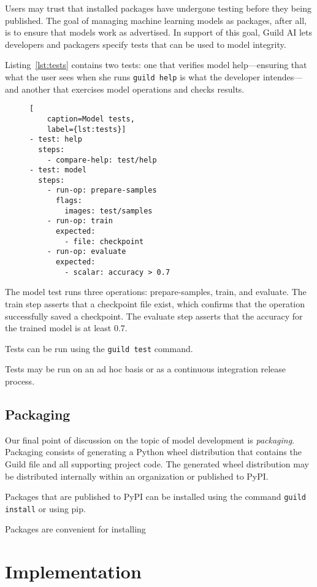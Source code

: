 \documentclass{article}
\begin{document}
Users may trust that installed packages have undergone testing before
they being published. The goal of managing machine learning models as
packages, after all, is to ensure that models work as advertised. In
support of this goal, Guild AI lets developers and packagers specify
tests that can be used to model integrity.

Listing~\ref{lst:tests} contains two tests: one that verifies model
help---ensuring that what the user sees when she runs
\verb|guild help| is what the developer intendes---and another that
exercises model operations and checks results.

\begin{figure}
\begin{lstlisting}[
    caption=Model tests,
    label={lst:tests}]
- test: help
  steps:
    - compare-help: test/help
- test: model
  steps:
    - run-op: prepare-samples
      flags:
        images: test/samples
    - run-op: train
      expected:
        - file: checkpoint
    - run-op: evaluate
      expected:
        - scalar: accuracy > 0.7
\end{lstlisting}
\end{figure}

The model test runs three operations: prepare-samples, train, and
evaluate. The train step asserts that a checkpoint file exist, which
confirms that the operation successfully saved a checkpoint. The
evaluate step asserts that the accuracy for the trained model is at
least 0.7.

Tests can be run using the \verb|guild test| command.

Tests may be run on an ad hoc basis or as a continuous integration
release process.

\subsection{Packaging}

Our final point of discussion on the topic of model development is
\emph{packaging}. Packaging consists of generating a Python wheel
distribution that contains the Guild file and all supporting project
code. The generated wheel distribution may be distributed internally
within an organization or published to PyPI.

Packages that are published to PyPI can be installed using the command
\verb|guild install| or using pip.

Packages are convenient for installing

\section{Implementation}
\end{document}
